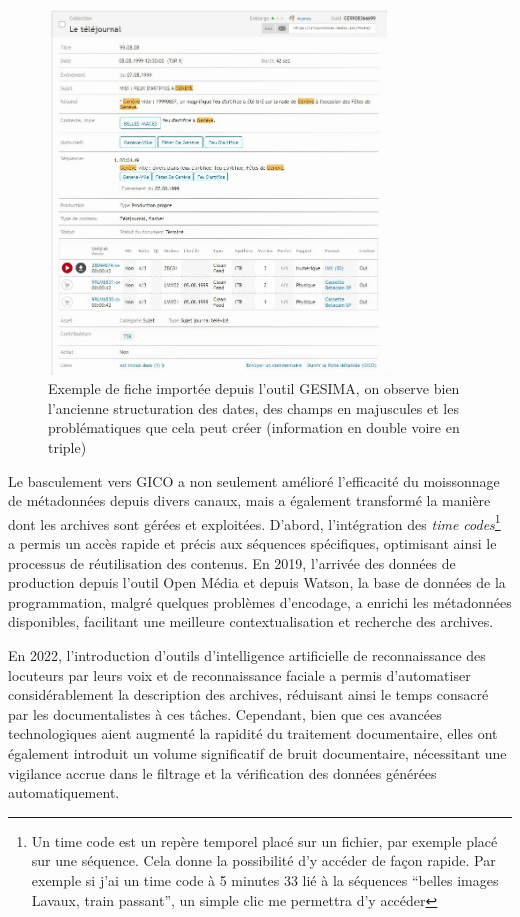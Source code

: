\begin{figure}[h!]
	\centering
	\includegraphics[width=0.8\textwidth]{images/image1.png}
	\caption{Exemple de fiche importée depuis l'outil GESIMA, on observe bien l'ancienne structuration des dates, des champs en majuscules et les problématiques que cela peut créer (information en double voire en triple)}
	\label{fig:image1}
\end{figure}

\newpage

Le basculement vers GICO a non seulement amélioré l'efficacité du moissonnage de métadonnées depuis divers canaux, mais a également transformé la manière dont les archives sont gérées et exploitées. D'abord, l'intégration des \textit{time codes}\footnote{Un time code est un repère temporel placé sur un fichier, par exemple placé sur une séquence. Cela donne la possibilité d'y accéder de façon rapide. Par exemple si j'ai un time code à 5 minutes 33 lié à la séquences \enquote{belles images Lavaux, train passant}, un simple clic me permettra d'y accéder} a permis un accès rapide et précis aux séquences spécifiques, optimisant ainsi le processus de réutilisation des contenus. En 2019, l'arrivée des données de production depuis l'outil Open Média et depuis Watson, la base de données de la programmation, malgré quelques problèmes d'encodage, a enrichi les métadonnées disponibles, facilitant une meilleure contextualisation et recherche des archives. 

En 2022, l'introduction d'outils d'intelligence artificielle de reconnaissance des locuteurs par leurs voix et de reconnaissance faciale a permis d'automatiser considérablement la description des archives, réduisant ainsi le temps consacré par les documentalistes à ces tâches. Cependant, bien que ces avancées technologiques aient augmenté la rapidité du traitement documentaire, elles ont également introduit un volume significatif de bruit documentaire, nécessitant une vigilance accrue dans le filtrage et la vérification des données générées automatiquement.

